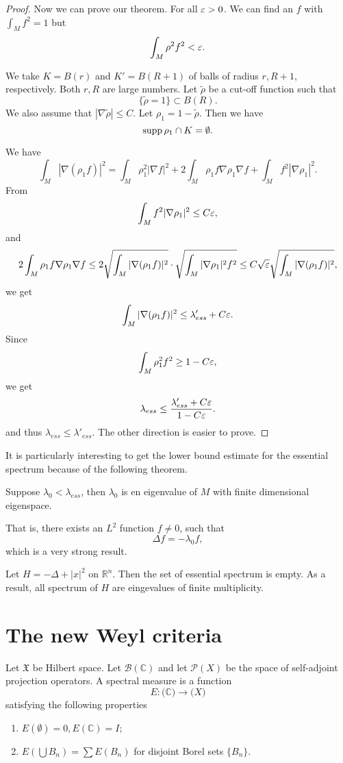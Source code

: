 \begin{proof}
Now we can prove our theorem.  For all $\varepsilon>0$. We can find an $f$ with $\int_M f^2=1$ but 
\[
\int_M\rho^2f^2<\varepsilon.
\]

We take $K=B(r)$ and $K'=B(R+1)$ of balls of radius $r, R+1$, respectively. Both $r,R$ are large numbers. Let $\tilde\rho$ be a cut-off function such that 
\[
\{\tilde\rho=1\}\subset B(R).
\]
We also assume that $|\nabla\tilde\rho|\leq C$. Let $\rho_1=1-\tilde\rho$. Then we have
\[
{\rm supp}\,\rho_1\cap K=\emptyset.
\]



We have
\[
\int_M|\nabla(\rho_1f)|^2=\int_M\rho_1^2|\nabla f|^2+2\int_M\rho_1f\nabla\rho_1\nabla f+\int_M f^2|\nabla \rho_1|^2.
\]
From
\[
\int_M f^2|\nabla \rho_1|^2\leq C\varepsilon,
\]
and 
\[
2\int_M\rho_1 f\nabla \rho_1\nabla f\leq 2 \sqrt{\int_M |\nabla(\rho_1 f)|^2}\cdot \sqrt{\int_M |\nabla\rho_1|^2f^2}\leq C\sqrt{\varepsilon}
\sqrt{\int_M |\nabla(\rho_1 f)|^2},
\]
we get
\[
\int_M|\nabla (\rho_1f)|^2\leq\lambda_{ess}'+C\varepsilon.
\]
Since
\[
\int_M\rho_1^2f^2\geq 1-C\varepsilon,
\]
we get
\[\lambda_{ess}\leq\frac{\lambda_{ess}'+C\varepsilon}{1-C\varepsilon}.
\]
and thus $\lambda_{ess}\leq\lambda'_{ess}$. The other direction is easier to prove.


\end{proof}

 It is particularly interesting to get the lower bound estimate for the essential spectrum because of the following theorem.

\begin{theorem} 
Suppose $\lambda_0<\lambda_{ess}$, then $\lambda_0$ is en eigenvalue of $M$ with finite dimensional eigenspace.
\end{theorem}


That is, there exists an $L^2$ function $f\neq 0$, such that 
\[
\Delta f=-\lambda_0 f,
\]
which is a very strong result.


\begin{example}
Let $H=-\Delta+|x|^2$ on $\mathbb R^n$. Then the set of essential spectrum is empty. As a result, all spectrum of $H$ are eingevalues of finite multiplicity.
\end{example}


\section{The new Weyl criteria}\label{Weyl_criteria}

Let $\mathfrak X$ be Hilbert space. Let $\mathscr B(\mathbb C)$ and let $\mathcal P(X)$ be the space of self-adjoint projection operators.  A spectral measure is a function
\[
E: \mathscr(\mathbb C)\to \mathcal (X)
\]
satisfying  the following properties
\begin{enumerate}
\item $E(\emptyset)=0, E(\mathbb C)=I$;
\item $E(\bigcup B_n)=\sum E(B_n)$ for disjoint Borel sets $\{B_n\}$.
\end{enumerate}

